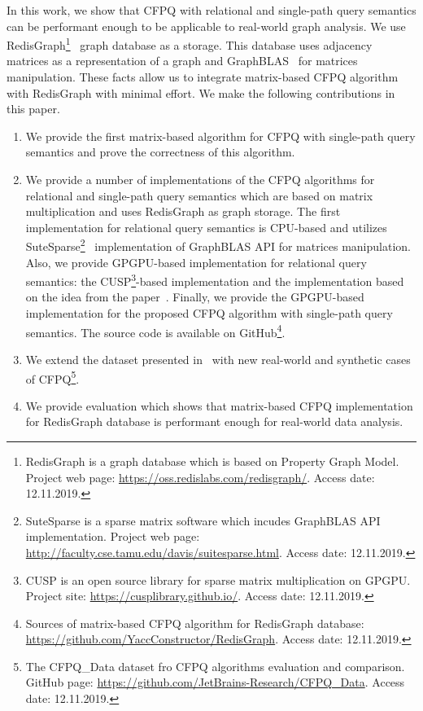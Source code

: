 In this work, we show that CFPQ with relational and single-path query semantics can be performant enough to be applicable to real-world graph analysis.
We use RedisGraph\footnote{RedisGraph is a graph database which is based on Property Graph Model. Project web page: \url{https://oss.redislabs.com/redisgraph/}. Access date: 12.11.2019.}~\cite{8778293} graph database as a storage.
This database uses adjacency matrices as a representation of a graph and GraphBLAS~\cite{7761646} for matrices manipulation.
These facts allow us to integrate matrix-based CFPQ algorithm with RedisGraph with minimal effort.
We make the following contributions in this paper.
\begin{enumerate}
\item We provide the first matrix-based algorithm for CFPQ with single-path query semantics and prove the correctness of this algorithm.
\item We provide a number of implementations of the CFPQ algorithms for relational and single-path query semantics which are based on matrix multiplication and uses RedisGraph as graph storage.
The first implementation for relational query semantics is CPU-based and utilizes SuteSparse\footnote{SuteSparse is a sparse matrix software which incudes GraphBLAS API implementation. Project web page: \url{http://faculty.cse.tamu.edu/davis/suitesparse.html}. Access date: 12.11.2019.}~\cite{Davis2018Algorithm9S} implementation of GraphBLAS API for matrices manipulation.
Also, we provide GPGPU-based implementation for relational query semantics: the CUSP\footnote{CUSP is an open source library for sparse matrix multiplication on GPGPU. Project site: \url{https://cusplibrary.github.io/}. Access date: 12.11.2019.}-based implementation and the implementation based on the idea from the paper~\cite{NsparsePaper}. Finally, we provide the GPGPU-based implementation for the proposed CFPQ algorithm with single-path query semantics. 
The source code is available on GitHub\footnote{Sources of matrix-based CFPQ algorithm for RedisGraph database: \url{https://github.com/YaccConstructor/RedisGraph}. Access date: 12.11.2019.}.
\item We extend the dataset presented in~\cite{Mishin:2019:ECP:3327964.3328503} with new real-world and synthetic cases of CFPQ\footnote{The CFPQ\_Data dataset fro CFPQ algorithms evaluation and comparison. GitHub page: \url{https://github.com/JetBrains-Research/CFPQ_Data}. Access date: 12.11.2019.}.
\item We provide evaluation which shows that matrix-based CFPQ implementation for RedisGraph database is performant enough for real-world data analysis.
\end{enumerate}

